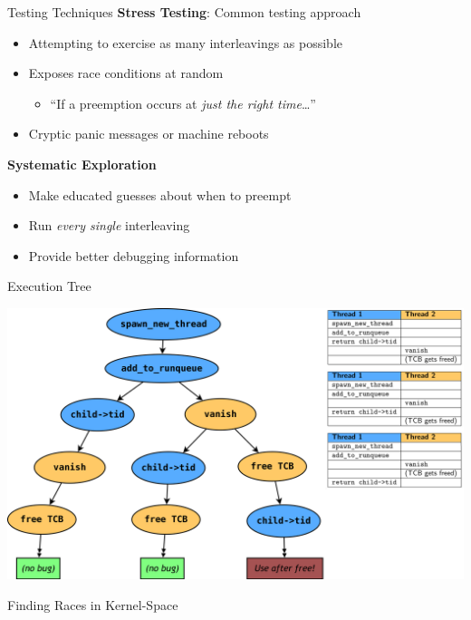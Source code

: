 \documentclass[xcolor=dvipsnames]{beamer}
\begin{document}
\begin{frame}{Testing Techniques} %
	\textbf{Stress Testing}: Common testing approach
	\begin{itemize}
		\item Attempting to exercise as many interleavings as possible
		\item Exposes race conditions at random
		\begin{itemize}
			\item ``If a preemption occurs at {\em just the right time}\dots''
		\end{itemize}
		\item Cryptic panic messages or machine reboots
	\end{itemize}
	\linegap

	{\bf Systematic Exploration}
	\begin{itemize}
		\item Make educated guesses about when to preempt
		\item Run {\em every single} interleaving
		\item Provide better debugging information
	\end{itemize}
\end{frame}

\begin{frame}{Execution Tree} %
	\begin{center}
		\includegraphics[width=\textwidth]{tree.png}
	\end{center}
\end{frame}

\begin{frame}{Finding Races in Kernel-Space}
\end{frame}
\end{document}
